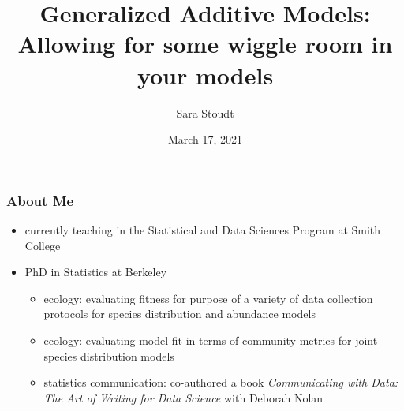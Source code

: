 \documentclass{beamer}
\title[GAMs]{Generalized Additive Models: \\ Allowing for some wiggle room in your models
} %
\author[@sastoudt]{Sara Stoudt
} %
\institute[Smith College] %
{
}
\date{March 17, 2021} %
\begin{document}
\begin{frame}
\titlepage %

\end{frame}


\begin{frame}
\frametitle{About Me}
\begin{itemize}
\item currently teaching in the Statistical and Data Sciences Program at Smith College
\item PhD in Statistics at Berkeley
\begin{itemize}
\item ecology: evaluating fitness for purpose of a variety of data collection protocols for species distribution and abundance models
\item ecology: evaluating model fit in terms of community metrics for joint species distribution models
\item statistics communication: co-authored a book \textit{Communicating with Data: The Art of Writing for Data Science} with Deborah Nolan
\end{itemize}
\end{itemize}
\end{frame}
\end{document}
